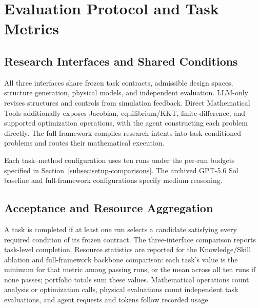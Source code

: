 \section{Evaluation Protocol and Task Metrics}
\label{app:abc-protocol}
\label{app:task-portfolio}

\subsection{Research Interfaces and Shared Conditions}
All three interfaces share frozen task contracts, admissible design spaces, structure generation, physical models, and independent evaluation. LLM-only revises structures and controls from simulation feedback. Direct Mathematical Tools additionally exposes Jacobian, equilibrium/KKT, finite-difference, and supported optimization operations, with the agent constructing each problem directly. The full framework compiles research intents into task-conditioned problems and routes their mathematical execution.

Each task--method configuration uses ten runs under the per-run budgets specified in Section~\ref{subsec:setup-comparisons}. The archived GPT-5.6 Sol baseline and full-framework configurations specify medium reasoning.

\subsection{Acceptance and Resource Aggregation}
A task is completed if at least one run selects a candidate satisfying every required condition of its frozen contract. The three-interface comparison reports task-level completion. Resource statistics are reported for the Knowledge/Skill ablation and full-framework backbone comparison: each task's value is the minimum for that metric among passing runs, or the mean across all ten runs if none passes; portfolio totals sum these values. Mathematical operations count analysis or optimization calls, physical evaluations count independent task evaluations, and agent requests and tokens follow recorded usage.


